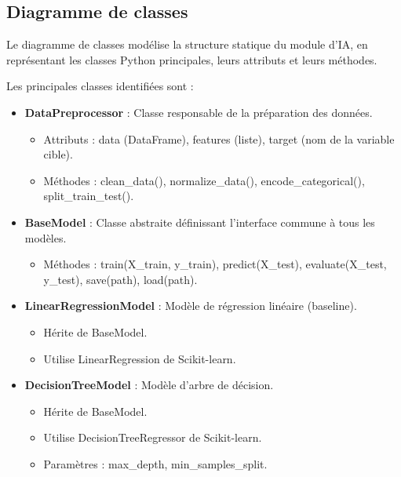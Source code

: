 \subsection{Diagramme de classes}
\label{subsec:sprint5-classes}

Le diagramme de classes modélise la structure statique du module d'IA, en représentant les classes Python principales, leurs attributs et leurs méthodes.

Les principales classes identifiées sont :

\begin{itemize}
    \item \textbf{DataPreprocessor} : Classe responsable de la préparation des données.
        \begin{itemize}
            \item Attributs : data (DataFrame), features (liste), target (nom de la variable cible).
            \item Méthodes : clean\_data(), normalize\_data(), encode\_categorical(), split\_train\_test().
        \end{itemize}
    
    \item \textbf{BaseModel} : Classe abstraite définissant l'interface commune à tous les modèles.
        \begin{itemize}
            \item Méthodes : train(X\_train, y\_train), predict(X\_test), evaluate(X\_test, y\_test), save(path), load(path).
        \end{itemize}
    
    \item \textbf{LinearRegressionModel} : Modèle de régression linéaire (baseline).
        \begin{itemize}
            \item Hérite de BaseModel.
            \item Utilise LinearRegression de Scikit-learn.
        \end{itemize}
    
    \item \textbf{DecisionTreeModel} : Modèle d'arbre de décision.
        \begin{itemize}
            \item Hérite de BaseModel.
            \item Utilise DecisionTreeRegressor de Scikit-learn.
            \item Paramètres : max\_depth, min\_samples\_split.
        \end{itemize}
    

\end{itemize}
